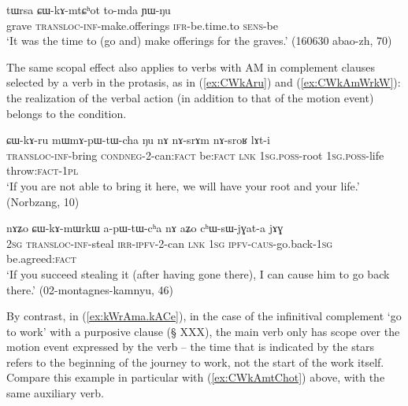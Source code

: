 \begin{exe}
\ex \label{ex:CWkAmtChot}
\gll tɯrsa ɕɯ-kɤ-mtɕʰot to-mda ɲɯ-ŋu \\
grave \textsc{transloc}-\textsc{inf}-make.offerings \textsc{ifr}-be.time.to \textsc{sens}-be \\
\glt `It was the time to (go and) make offerings for the graves.' (160630 abao-zh, 70)
 \end{exe} 
 
The same scopal effect also applies to  verbs with AM in complement clauses selected by a verb in the protasis, as in (\ref{ex:CWkAru}) and (\ref{ex:CWkAmWrkW}): the realization of the verbal action (in addition to that of the motion event) belongs to the condition.

\begin{exe}
\ex \label{ex:CWkAru}
\gll ɕɯ-kɤ-ru mɯ\redp{}mɤ-pɯ-tɯ-cha ŋu nɤ nɤ-srɤm nɤ-sroʁ lɤt-i \\
\textsc{transloc}-\textsc{inf}-bring \textsc{cond}\redp{}\textsc{neg}-2-can:\textsc{fact} be:\textsc{fact} \textsc{lnk} \textsc{1sg.poss}-root \textsc{1sg.poss}-life throw:\textsc{fact}-\textsc{1pl} \\ 
\glt `If you are not able to bring it here, we will have your root and your life.' (Norbzang, 10)
\end{exe}

\begin{exe}
\ex \label{ex:CWkAmWrkW}
\gll nɤʑo ɕɯ-kɤ-mɯrkɯ a-pɯ-tɯ-cʰa nɤ aʑo cʰɯ-sɯ-jɣat-a jɤɣ \\
\textsc{2sg} \textsc{transloc}-\textsc{inf}-steal \textsc{irr}-\textsc{ipfv}-2-can \textsc{lnk} \textsc{1sg} \textsc{ipfv}-\textsc{caus}-go.back-\textsc{1sg} be.agreed:\textsc{fact} \\
\glt `If you succeed stealing it (after having gone there), I can cause him to go back there.' (02-montagnes-kamnyu, 46)
\end{exe}

 
By contrast, in  (\ref{ex:kWrAma.kACe}), in the case of the infinitival complement  `go to work' with a purposive clause  (§ XXX), the main verb  only has scope over the motion event expressed by the verb  -- the time that is indicated by the stars refers to the beginning of the journey to work, not the start of the work itself. Compare this example in particular with (\ref{ex:CWkAmtChot}) above, with the same auxiliary verb.
 
